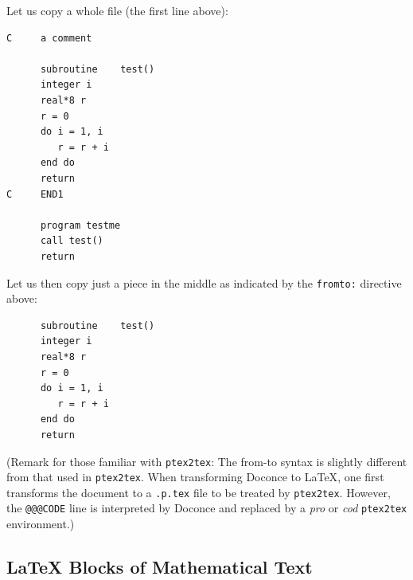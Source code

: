 \documentclass{article}
\begin{document}
Let us copy a whole file (the first line above):
\providecommand{\shadedwbar}{}
\renewenvironment{shadedwbar}{
\def\FrameCommand{\color[rgb]{0.7,     0.95686, 1}\vrule width 1mm\normalcolor\colorbox{shadecolor}}\FrameRule0.6pt
\MakeFramed {\advance\hsize-2mm\FrameRestore}\vskip3mm}{\vskip0mm\endMakeFramed}
\providecommand{\shadedquoteBlueBar}{}
\renewenvironment{shadedquoteBlueBar}[1][]{
\bgroup\rmfamily
\fboxsep=0mm\relax
\begin{shadedwbar}
\list{}{\parsep=-2mm\parskip=0mm\topsep=0pt\leftmargin=2mm
\rightmargin=2\leftmargin\leftmargin=4pt\relax}
\item\relax}
{\endlist\end{shadedwbar}\egroup}\begin{shadedquoteBlueBar}
\fontsize{9pt}{9pt}
\begin{Verbatim}
C     a comment

      subroutine    test()
      integer i
      real*8 r
      r = 0
      do i = 1, i
         r = r + i
      end do
      return
C     END1

      program testme
      call test()
      return
\end{Verbatim}
\end{shadedquoteBlueBar}
\noindent

Let us then copy just a piece in the middle as indicated by the {\fontsize{10pt}{10pt}\verb!fromto:!}
directive above:
\begin{shadedquoteBlue}
\fontsize{9pt}{9pt}
\begin{Verbatim}
      subroutine    test()
      integer i
      real*8 r
      r = 0
      do i = 1, i
         r = r + i
      end do
      return
\end{Verbatim}
\end{shadedquoteBlue}
\noindent

(Remark for those familiar with {\fontsize{10pt}{10pt}\verb!ptex2tex!}: The from-to
syntax is slightly different from that used in {\fontsize{10pt}{10pt}\verb!ptex2tex!}. When
transforming Doconce to {\LaTeX}, one first transforms the document to a
{\fontsize{10pt}{10pt}\verb!.p.tex!} file to be treated by {\fontsize{10pt}{10pt}\verb!ptex2tex!}. However, the {\fontsize{10pt}{10pt}\verb!@@@CODE!} line
is interpreted by Doconce and replaced by a \emph{pro} or \emph{cod} {\fontsize{10pt}{10pt}\verb!ptex2tex!}
environment.)

\subsection{{\LaTeX} Blocks of Mathematical Text}
\end{document}
